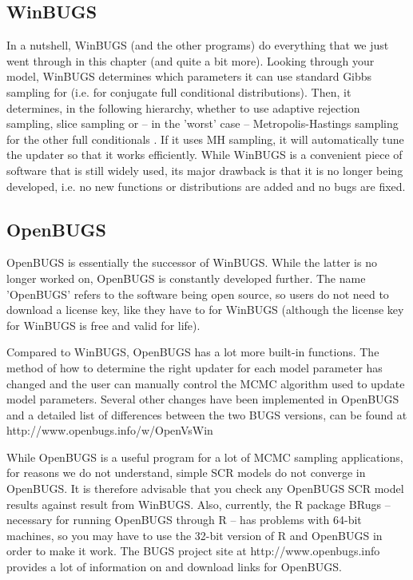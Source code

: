 \subsection{WinBUGS}
In a nutshell, WinBUGS (and the other programs) do everything that we just went through in this chapter (and quite a bit more). Looking through your model, WinBUGS determines which parameters it can use standard Gibbs sampling for (i.e. for conjugate full conditional distributions). Then, it determines, in the following hierarchy, whether to use adaptive rejection sampling, slice sampling or – in the 'worst' case – Metropolis-Hastings sampling for the other full conditionals \citep{spiegelhalter_etal:2003}. If it uses MH sampling, it will automatically tune the updater so that it works efficiently.
While WinBUGS is a convenient piece of software that is still widely used, its major drawback is that it is no longer being developed, i.e. no new functions or distributions are added and no bugs are fixed.

\subsection{OpenBUGS}
OpenBUGS is essentially the successor of WinBUGS. While the latter is
no longer worked on, OpenBUGS is constantly developed further. The
name 'OpenBUGS' refers to the software being open source, so users do
not need to download a license key, like they have to for WinBUGS
(although the license key for WinBUGS is free and valid for life). 

Compared to WinBUGS, OpenBUGS has a lot more built-in functions. The
method of how to determine the right updater for each model parameter
has changed and the user can manually control the MCMC algorithm used
to update model parameters.  Several other changes have been
implemented in OpenBUGS and a detailed list of differences between the
two BUGS versions, can be found at
http://www.openbugs.info/w/OpenVsWin 

While OpenBUGS is a useful program for a lot of MCMC sampling
applications, for reasons we do not understand, simple SCR models do
not converge in OpenBUGS. It is therefore advisable that you check any
OpenBUGS SCR model results against result from WinBUGS. Also,
currently, the R package BRugs \citep{thomas_etal:2006} – necessary
for running OpenBUGS through R – has problems with 64-bit machines, so
you may have to use the 32-bit version of R and OpenBUGS in order to
make it work. The BUGS project site at http://www.openbugs.info
provides a lot of information on and download links for OpenBUGS. 

